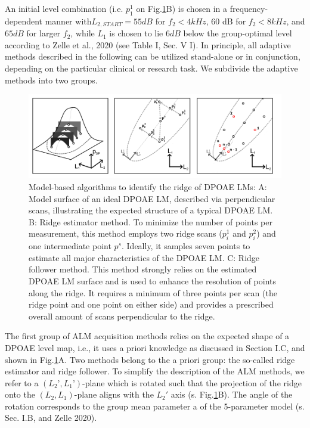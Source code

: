 \documentclass[journal,twoside,web]{ieeecolor2}
\begin{document}
An initial level combination (i.e.
$p_1^1$ on Fig.\ref{fig_AMB}B) is chosen in a frequency-dependent manner with$L_{2,START} = 55 dB$ for $f_2 < 4 kHz$, 60 dB for $f_2 < 8 kHz$, and $65 dB$ for larger $f_2$, while $L_1$ is chosen to lie $6 dB$ below the group-optimal level according to Zelle et al., 2020 (see Table I, Sec. V  I).
 In principle, all adaptive methods described in the following can be utilized stand-alone or in conjunction, depending on the particular clinical or research task.
We subdivide the adaptive methods into two groups.

\begin{figure}
\includegraphics[width=\textwidth]{Fig_ALM_ModelBased} %
\caption{Model-based algorithms to identify the ridge of DPOAE LMs: A: Model surface of an ideal DPOAE LM, described via perpendicular scans, illustrating the expected structure of a typical DPOAE LM.
B: Ridge estimator method.
To minimize the number of points per measurement, this method employs two ridge scans ($p^1_i$ and $p^2_i$) and one intermediate point $p^s$.
Ideally, it samples seven points to estimate all major characteristics of the DPOAE LM.
C: Ridge follower method.
This method strongly relies on the estimated DPOAE LM surface and is used to enhance the resolution of points along the ridge.
It requires a minimum of three points per scan (the ridge point and one point on either side) and provides a prescribed overall amount of scans perpendicular to the ridge.}
\label{fig_AMB}
\end{figure}

The first group of ALM acquisition methods relies on the expected shape of a DPOAE level map, i.e., it uses a priori knowledge as discussed in Section I.C, and shown in Fig.\ref{fig_AMB}A.
Two methods belong to the a priori group: the so-called ridge estimator and ridge follower.
To simplify the description of the ALM methods, we refer to a $(L_2’, L_1’)$-plane which is rotated such that the projection of the ridge onto the $(L_2, L_1)$-plane aligns with the $L_2'$ axis (s.
Fig.\ref{fig_AMB}B).
 The angle of the rotation corresponds to the group mean parameter a of the 5-parameter model (s.
Sec.
I.B, and Zelle 2020).
\end{document}

